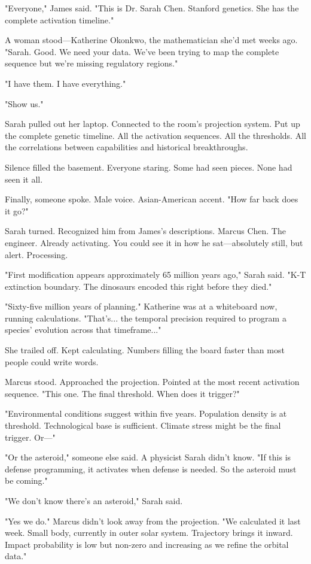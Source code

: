 "Everyone," James said. "This is Dr. Sarah Chen. Stanford genetics. She has the complete activation timeline."

A woman stood—Katherine Okonkwo, the mathematician she'd met weeks ago. "Sarah. Good. We need your data. We've been trying to map the complete sequence but we're missing regulatory regions."

"I have them. I have everything."

"Show us."

Sarah pulled out her laptop. Connected to the room's projection system. Put up the complete genetic timeline. All the activation sequences. All the thresholds. All the correlations between capabilities and historical breakthroughs.

Silence filled the basement. Everyone staring. Some had seen pieces. None had seen it all.

Finally, someone spoke. Male voice. Asian-American accent. "How far back does it go?"

Sarah turned. Recognized him from James's descriptions. Marcus Chen. The engineer. Already activating. You could see it in how he sat—absolutely still, but alert. Processing.

"First modification appears approximately 65 million years ago," Sarah said. "K-T extinction boundary. The dinosaurs encoded this right before they died."

"Sixty-five million years of planning." Katherine was at a whiteboard now, running calculations. "That's... the temporal precision required to program a species' evolution across that timeframe..."

She trailed off. Kept calculating. Numbers filling the board faster than most people could write words.

Marcus stood. Approached the projection. Pointed at the most recent activation sequence. "This one. The final threshold. When does it trigger?"

"Environmental conditions suggest within five years. Population density is at threshold. Technological base is sufficient. Climate stress might be the final trigger. Or—"

"Or the asteroid," someone else said. A physicist Sarah didn't know. "If this is defense programming, it activates when defense is needed. So the asteroid must be coming."

"We don't know there's an asteroid," Sarah said.

"Yes we do." Marcus didn't look away from the projection. "We calculated it last week. Small body, currently in outer solar system. Trajectory brings it inward. Impact probability is low but non-zero and increasing as we refine the orbital data."

